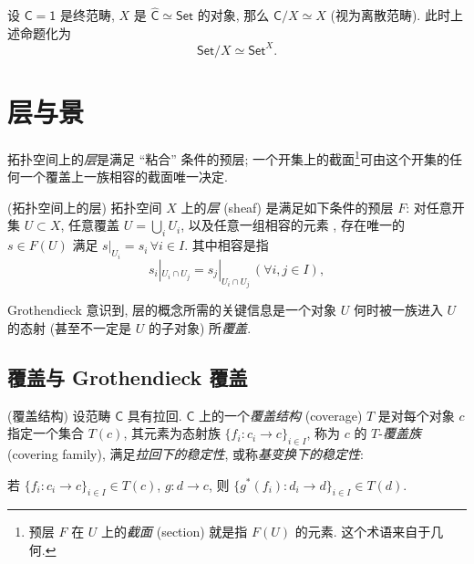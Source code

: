 \begin{example}
    {}
    设 $\mathsf C = \mathsf 1$ 是终范畴,
    $X$ 是 $\widehat {\mathsf C} \simeq \mathsf {Set}$ 的对象,
    那么 $\mathsf C/X \simeq X$ (视为离散范畴).
    此时上述命题化为
    $$
    \mathsf {Set}/X \simeq \mathsf {Set}^X.
    $$
\end{example}


\section{层与景}

拓扑空间上的\emph{层}是满足 ``粘合'' 条件的预层; 一个开集上的截面\footnote{预层 $F$ 在 $U$ 上的\emph{截面} (section) 就是指 $F(U)$ 的元素. 这个术语来自于几何.}可由这个开集的任何一个覆盖上一族相容的截面唯一决定.

\begin{definition}
    {(拓扑空间上的层)}
    拓扑空间 $X$ 上的\emph{层} (sheaf) 是满足如下条件的预层 $F$:
    对任意开集 $U\subset X$, 任意覆盖 $U = \bigcup_i U_i$,
    以及任意一组相容的元素 ,
    存在唯一的 $s\in F(U)$
    满足 $s|_{U_i} = s_i\,\forall i\in I$.
    其中相容是指
    \begin{equation}
        s_i|_{U_i\cap U_j} = s_j|_{U_i\cap U_j}\,(\forall i,j \in I),
        \label{sheaf-condition}
    \end{equation}
\end{definition}

Grothendieck 意识到, 层的概念所需的关键信息是一个对象 $U$ 何时被一族进入 $U$ 的态射 (甚至不一定是 $U$ 的子对象) 所\emph{覆盖}.

\subsection{覆盖与 Grothendieck 覆盖}
\begin{definition}{(覆盖结构)}
    设范畴 $\mathsf C$ 具有拉回.
    $\mathsf C$ 上的一个\emph{覆盖结构} (coverage) $T$ 是对每个对象 $c$ 指定一个集合 $T(c)$, 其元素为态射族 $\{f_i \colon c_i \to c\}_{i\in I}$, 称为 $c$ 的 $T$-\emph{覆盖族} (covering family), 满足\emph{拉回下的稳定性}, 或称\emph{基变换下的稳定性}:
    \begin{center}
    	若 $\{f_i \colon c_i \to c\}_{i\in I}\in T(c)$, $g \colon d \to c$,
    	则 $\{g^*(f_i) \colon d_i \to d\}_{i\in I}\in T(d)$.
    \end{center}
    
    
\end{definition}

